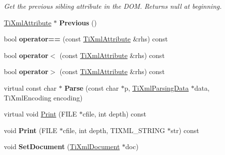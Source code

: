 \begin{DoxyCompactItemize}
\begin{DoxyCompactList}\small\item\em \-Get the previous sibling attribute in the \-D\-O\-M. \-Returns null at beginning. \end{DoxyCompactList}\item 
\hypertarget{classTiXmlAttribute_ae4dabc932cba945ed1e92fec5f121193}{
\hyperlink{classTiXmlAttribute}{\-Ti\-Xml\-Attribute} $\ast$ {\bfseries \-Previous} ()}
\label{d4/dc1/classTiXmlAttribute_ae4dabc932cba945ed1e92fec5f121193}

\item 
\hypertarget{classTiXmlAttribute_ae48c2a65b520d453914ce4e845d607cf}{
bool {\bfseries operator==} (const \hyperlink{classTiXmlAttribute}{\-Ti\-Xml\-Attribute} \&rhs) const }
\label{d4/dc1/classTiXmlAttribute_ae48c2a65b520d453914ce4e845d607cf}

\item 
\hypertarget{classTiXmlAttribute_adb8b6f2cad5948e73e383182e7ce10de}{
bool {\bfseries operator$<$} (const \hyperlink{classTiXmlAttribute}{\-Ti\-Xml\-Attribute} \&rhs) const }
\label{d4/dc1/classTiXmlAttribute_adb8b6f2cad5948e73e383182e7ce10de}

\item 
\hypertarget{classTiXmlAttribute_a867562769ef9778c1690cd373246b05b}{
bool {\bfseries operator$>$} (const \hyperlink{classTiXmlAttribute}{\-Ti\-Xml\-Attribute} \&rhs) const }
\label{d4/dc1/classTiXmlAttribute_a867562769ef9778c1690cd373246b05b}

\item 
\hypertarget{classTiXmlAttribute_ad62774421b814894b995af3b5d231dda}{
virtual const char $\ast$ {\bfseries \-Parse} (const char $\ast$p, \hyperlink{classTiXmlParsingData}{\-Ti\-Xml\-Parsing\-Data} $\ast$data, \-Ti\-Xml\-Encoding encoding)}
\label{d4/dc1/classTiXmlAttribute_ad62774421b814894b995af3b5d231dda}

\item 
virtual void \hyperlink{classTiXmlAttribute_acc04956c1d5c4c31fe74f7a7528d109a}{\-Print} (\-F\-I\-L\-E $\ast$cfile, int depth) const 
\item 
\hypertarget{classTiXmlAttribute_a19e6b6862a80b188571c47947e88d030}{
void {\bfseries \-Print} (\-F\-I\-L\-E $\ast$cfile, int depth, \-T\-I\-X\-M\-L\-\_\-\-S\-T\-R\-I\-N\-G $\ast$str) const }
\label{d4/dc1/classTiXmlAttribute_a19e6b6862a80b188571c47947e88d030}

\item 
\hypertarget{classTiXmlAttribute_ac12a94d4548302afb12f488ba101f7d1}{
void {\bfseries \-Set\-Document} (\hyperlink{classTiXmlDocument}{\-Ti\-Xml\-Document} $\ast$doc)}
\label{d4/dc1/classTiXmlAttribute_ac12a94d4548302afb12f488ba101f7d1}

\end{DoxyCompactItemize}
